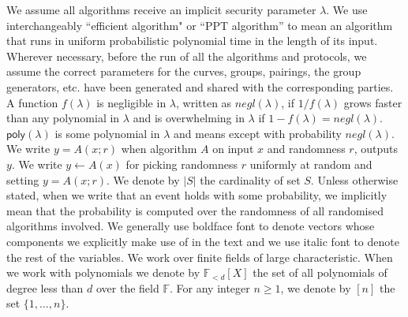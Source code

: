 \noindent We assume all algorithms receive an implicit security parameter $\lambda$. 
We use interchangeably ``efficient algorithm" or ``PPT algorithm'' to mean an algorithm that runs in uniform probabilistic polynomial 
time in the length of its input. 
Wherever necessary, before the run of all the algorithms and protocols, we assume the correct parameters for the 
curves, groups, pairings, the group generators, etc. have been generated and shared with the corresponding parties. 
A function $f(\lambda)$ is negligible in $\lambda$, written as $\mathit{negl}(\lambda)$, if $1/f(\lambda)$ grows faster than 
any polynomial in $\lambda$ and is overwhelming in $\lambda$ if $1-f(\lambda)=\mathit{negl}(\lambda)$. $\mathsf{poly}(\lambda)$ 
is some polynomial in $\lambda$ and \ewnp means except with probability $\mathit{negl}(\lambda)$.
We write $y = A(x; r)$ when algorithm $A$ on input $x$ and randomness $r$, outputs $y$.
We write $y \leftarrow A(x)$ for picking randomness $r$ uniformly at random and setting $y = A(x; r)$. We denote by $|S|$ the cardinality of set $S$. 
Unless otherwise stated, when we write that an event holds with some probability, we implicitly mean 
that the probability is computed over the randomness of all randomised algorithms involved.
We generally use boldface font to denote vectors whose components we explicitly make use of in the text and 
we use italic font to denote the rest of the variables. We work over finite fields of large characteristic. 
When we work with polynomials we denote by 
$\mathbb{F}_{<d}[X]$ the set of all polynomials of degree less than $d$ over the field $\mathbb{F}$. For any integer 
$n \geq 1$, we denote by $[n]$ the set $\{1, \ldots, n\}$.
